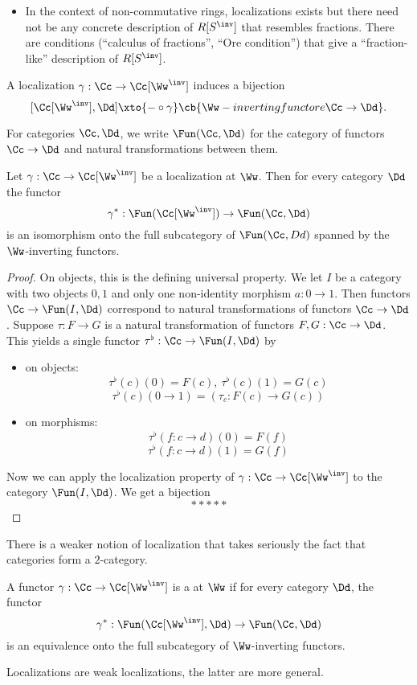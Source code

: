 \begin{itemize}[label={-}]
    \item In the context of non-commutative rings, localizations exists but there need not be any concrete description of $R[S^\inv]$ that resembles fractions. There are conditions (\enquote{calculus of fractions}, \enquote{Ore condition}) that give a \enquote{fraction-like} description of $R[S^\inv]$.
\end{itemize}

A localization $\gamma:\Cc\to\Cc[\Ww^\inv]$ induces a bijection
\[[\Cc[\Ww^\inv],\Dd]\xto{-\circ\gamma}\cb{\Ww-inverting functore \Cc\to\Dd}.\]

For categories $\Cc,\Dd$, we write $\Fun(\Cc,\Dd)$ for the category of functors $\Cc\to\Dd$ and natural transformations between them.

\begin{proposition}
Let $\gamma:\Cc\to\Cc[\Ww^\inv]$ be a localization at $\Ww$. Then for every category $\Dd$ the functor
\[\gamma^*:\Fun(\Cc[\Ww^\inv])\to\Fun(\Cc,\Dd)\]
is an isomorphism onto the full subcategory of $\Fun(\Cc,Dd)$ spanned by the $\Ww$-inverting functors.
\end{proposition}

\begin{proof}
On objects, this is the defining universal property. We let $I$ be a category with two objects $0,1$ and only one non-identity morphism $a:0\to1$. Then functors $\Cc\to\Fun(I,\Dd)$ correspond to natural transformations of functors $\Cc\to\Dd$.
Suppose $\tau:F\to G$ is a natural transformation of functors $F,G:\Cc\to\Dd$. This yields a single functor $\tau^\flat:\Cc\to\Fun(I,\Dd)$ by
\begin{itemize}[label={-}]
    \item on objects:
    \[\tau^\flat(c)(0)=F(c),\ \tau^\flat(c)(1)=G(c)\]
    \[\tau^\flat(c)(0\to1)=(\tau_c:F(c)\to G(c))\]
    \item on morphisms:
    \[\tau^\flat(f:c\to d)(0)=F(f)\]
    \[\tau^\flat(f:c\to d)(1)=G(f)\]
\end{itemize}

Now we can apply the localization property of $\gamma:\Cc\to\Cc[\Ww^\inv]$ to the category $\Fun(I,\Dd)$. We get a bijection
\[*****\]
\end{proof}

\begin{remark}
There is a weaker notion of localization that takes seriously the fact that categories form a $2$-category.

A functor $\gamma:\Cc\to\Cc[\Ww^\inv]$ is a  at $\Ww$ if for every category $\Dd$, the functor
\[\gamma^*:\Fun(\Cc[\Ww^\inv],\Dd)\to\Fun(\Cc,\Dd)\]
is an equivalence onto the full subcategory of $\Ww$-inverting functors.

Localizations are weak localizations, the latter are more general.
\end{remark}

